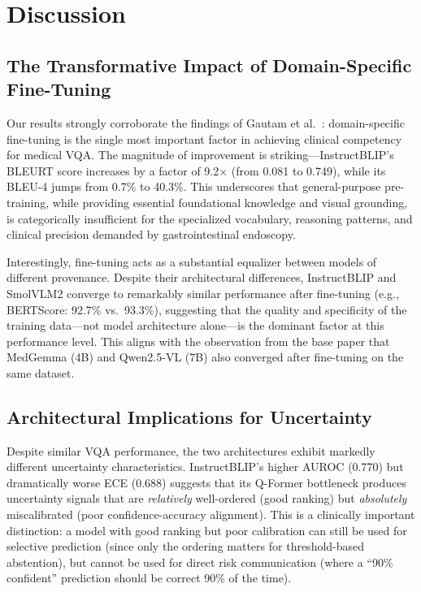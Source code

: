 \documentclass[pdflatex,sn-mathphys-num]{sn-jnl}
\begin{document}
\section{Discussion}\label{sec:discussion}

\subsection{The Transformative Impact of Domain-Specific Fine-Tuning}

Our results strongly corroborate the findings of Gautam et al.~\cite{gautam2025kvasirx1}: domain-specific fine-tuning is the single most important factor in achieving clinical competency for medical VQA. The magnitude of improvement is striking---InstructBLIP's BLEURT score increases by a factor of 9.2$\times$ (from 0.081 to 0.749), while its BLEU-4 jumps from 0.7\% to 40.3\%. This underscores that general-purpose pre-training, while providing essential foundational knowledge and visual grounding, is categorically insufficient for the specialized vocabulary, reasoning patterns, and clinical precision demanded by gastrointestinal endoscopy.

Interestingly, fine-tuning acts as a substantial equalizer between models of different provenance. Despite their architectural differences, InstructBLIP and SmolVLM2 converge to remarkably similar performance after fine-tuning (e.g., BERTScore: 92.7\% vs.\ 93.3\%), suggesting that the quality and specificity of the training data---not model architecture alone---is the dominant factor at this performance level. This aligns with the observation from the base paper that MedGemma (4B) and Qwen2.5-VL (7B) also converged after fine-tuning on the same dataset.

\subsection{Architectural Implications for Uncertainty}

Despite similar VQA performance, the two architectures exhibit markedly different uncertainty characteristics. InstructBLIP's higher AUROC (0.770) but dramatically worse ECE (0.688) suggests that its Q-Former bottleneck produces uncertainty signals that are \textit{relatively} well-ordered (good ranking) but \textit{absolutely} miscalibrated (poor confidence-accuracy alignment). This is a clinically important distinction: a model with good ranking but poor calibration can still be used for selective prediction (since only the ordering matters for threshold-based abstention), but cannot be used for direct risk communication (where a ``90\% confident'' prediction should be correct 90\% of the time).
\end{document}
